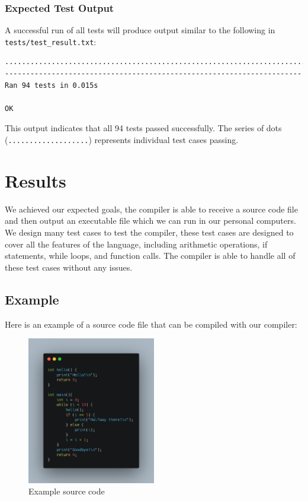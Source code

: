 \documentclass[12pt, letterpaper]{article}
\begin{document}
\subsubsection*{Expected Test Output}
A successful run of all tests will produce output similar to the following in \texttt{tests/test\_result.txt}:

\begin{lstlisting}[language={}, basicstyle=\ttfamily\footnotesize, frame=none, breaklines=true]
..............................................................................................
----------------------------------------------------------------------
Ran 94 tests in 0.015s

OK
\end{lstlisting}

This output indicates that all 94 tests passed successfully. The series of dots (\texttt{...................}) represents individual test cases passing.

\section{Results}

We achieved our expected goals, the compiler is able to receive a source code file and then output an executable file which we can run in our personal computers.
We design many test cases to test the compiler, these test cases are designed to cover all the features of the language, including arithmetic operations, if statements, while loops, and function calls. The compiler is able to handle all of these test cases without any issues.

\subsection*{Example}

Here is an example of a source code file that can be compiled with our compiler:

\begin{figure}[H]
    \centering
    \includegraphics[width=0.5\textwidth]{1.png}
    \caption{Example source code}
    \label{fig:example_source_code}
\end{figure}
\end{document}
